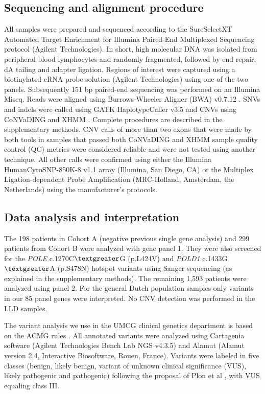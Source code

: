 \subsection{Sequencing and alignment procedure}
All samples were prepared and sequenced according to the SureSelectXT Automated Target Enrichment for Illumina Paired-End Multiplexed Sequencing protocol (Agilent Technologies). 
In short, high molecular DNA was isolated from peripheral blood lymphocytes and randomly fragmented, followed by end repair, dA tailing and adapter ligation. 
Regions of interest were captured using a biotinylated cRNA probe solution (Agilent Technologies) using one of the two panels. Subsequently 151 bp paired-end sequencing was performed on an Illumina Miseq. 
Reads were aligned using Burrows-Wheeler Aligner (BWA) v0.7.12 \cite{Li_2010}. 
SNVs and indels were called using GATK HaplotypeCaller v3.5 and CNVs using CoNVaDING \cite{Johansson_2016b} and XHMM \cite{Fromer_2012}. 
Complete procedures are described in the supplementary methods. 
CNV calls of more than two exons that were made by both tools in samples that passed both CoNVaDING and XHMM sample quality control (QC) metrics were considered reliable and were not tested using another technique. 
All other calls were confirmed using either the Illumina HumanCytoSNP-850K-8 v1.1 array (Illumina, San Diego, CA) or the Multiplex Ligation-dependent Probe Amplification (MRC-Holland, Amsterdam, the Netherlands) using the manufacturer’s protocols. 

\subsection{Data analysis and interpretation}
The 198 patients in Cohort A (negative previous single gene analysis) and 299 patients from Cohort B were analyzed with gene panel 1. 
They were also screened for the \textsl{POLE} c.1270C$\textgreater$G (p.L424V) and \textsl{POLD1} c.1433G$\textgreater$A (p.S478N) hotspot variants \cite{Palles_2012} using Sanger sequencing (as explained in the supplementary methods). 
The remaining 1,593 patients were analyzed using panel 2. 
For the general Dutch population samples only variants in our 85 panel genes were interpreted. 
No CNV detection was performed in the LLD samples.

The variant analysis we use in the UMCG clinical genetics department is based on the ACMG rules \cite{Richards_2015}. 
All annotated variants were analyzed using Cartagenia software (Agilent Technologies Bench Lab NGS v4.3.5) and Alamut (Alamut version 2.4, Interactive Biosoftware, Rouen, France). 
Variants were labeled in five classes (benign, likely benign, variant of unknown clinical significance (VUS), likely pathogenic and pathogenic) following the proposal of Plon et al \cite{Plon_2008}, with VUS equaling class III.

